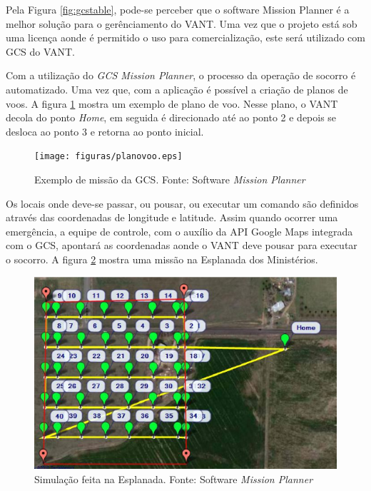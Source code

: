 Pela Figura \ref{fig:gcstable}, pode-se perceber que o software Mission Planner é a melhor solução para o gerênciamento do VANT. Uma vez que o projeto está sob uma licença aonde é permitido o uso para comercialização, este será utilizado com GCS do VANT.

Com a utilização do \textit{GCS Mission Planner}, o processo da operação de socorro é automatizado. 
Uma vez que, com a aplicação é possível a criação de planos de voos. 
A figura \ref{fig:planovoo} mostra um exemplo de plano de voo. 
Nesse plano, o VANT decola do ponto \textit{Home}, em seguida é direcionado até ao ponto 2 e depois 
se desloca ao ponto 3 e retorna ao ponto inicial.

\begin{figure}[h!]
    \centering
	    \texttt{[image: figuras/planovoo.eps]}
    \caption{Exemplo de missão da GCS. Fonte: Software \textit{Mission Planner}}
    \label{fig:planovoo}
\end{figure}


Os locais onde deve-se passar, ou pousar, ou executar um comando são definidos através das coordenadas de longitude e latitude. Assim quando ocorrer uma emergência, a equipe de controle, com o auxílio da API Google Maps integrada com o GCS, apontará as coordenadas aonde o VANT deve pousar para executar o socorro. 
A figura \ref{fig:esplanada} mostra uma missão na Esplanada dos Ministérios.

\begin{figure}[h!]
    \centering
	    \includegraphics[keepaspectratio=true,scale=0.8]{figuras/esplanada.eps}
    \caption{Simulação feita na Esplanada. Fonte: Software \textit{Mission Planner}}
    \label{fig:esplanada}
\end{figure}

